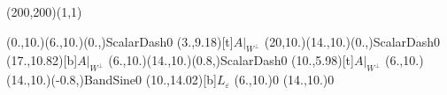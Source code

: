\unitlength=1bp%

\begin{feynartspicture}(200,200)(1,1)

\FADiagram{}
\FAProp(0.,10.)(6.,10.)(0.,){ScalarDash}{0}
\FALabel(3.,9.18)[t]{$A|_{W^\perp}$}
\FAProp(20,10.)(14.,10.)(0.,){ScalarDash}{0}
\FALabel(17.,10.82)[b]{$A|_{W^\perp}$}
\FAProp(6.,10.)(14.,10.)(0.8,){ScalarDash}{0}
\FALabel(10.,5.98)[t]{$A|_{W^\perp}$}
\FAProp(6.,10.)(14.,10.)(-0.8,){BandSine}{0}
\FALabel(10.,14.02)[b]{$L_\varepsilon$}
\FAVert(6.,10.){0}
\FAVert(14.,10.){0}
\end{feynartspicture}

